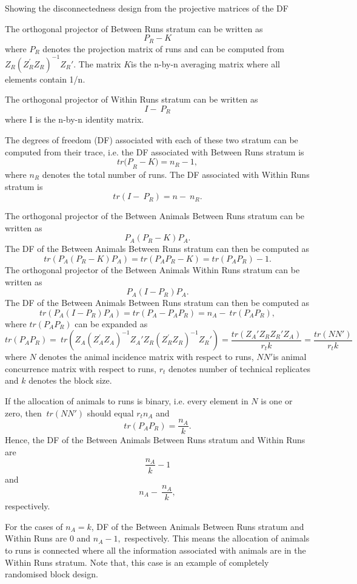 
\noindent Showing the disconnectedness design from the projective matrices of the DF

\noindent The orthogonal projector of Between Runs stratum can be written as 
\[P_R-K\] 
where $P_R$ denotes the projection matrix of runs and can be computed from $Z_R{(Z^'_RZ_R)}^{-1}Z_R'$. The matrix $K$is the n-by-n averaging matrix where all elements contain 1/n. 

\noindent The orthogonal projector of Within Runs stratum can be written as 
\[I-\ P_R\] 
where I is the n-by-n identity matrix. 

\noindent The degrees of freedom (DF) associated with each of these two stratum can be computed from their trace, i.e. the DF associated with Between Runs stratum is 
\[{tr(P}_R-K)=n_R-1,\] 
where $n_R$ denotes the total number of runs. The DF associated with Within Runs stratum is 
\[tr\left(I-\ P_R\right)=n-\ n_R.\] 


\noindent The orthogonal projector of the Between Animals Between Runs stratum can be written as 
\[P_A\left(P_R-K\right)P_A.\] 
The DF of the Between Animals Between Runs stratum can then be computed as
\[tr\left(P_A\left(P_R-K\right)P_A\right)=tr\left(P_AP_R-K\right)=tr\left(P_AP_R\right)-1.\] 
The orthogonal projector of the Between Animals Within Runs stratum can be written as 
\[P_A\left(I-P_R\right)P_A.\] 
The DF of the Between Animals Between Runs stratum can then be computed as
\[tr\left(P_A\left(I-P_R\right)P_A\right)=tr\left(P_A-P_AP_R\right)=n_A-\ tr\left(P_AP_R\right),\] 
where $tr\left(P_AP_R\right)$ can be expanded as 
\[tr\left(P_AP_R\right)=\ tr\left(Z_A{(Z^'_AZ_A)}^{-1}Z_A'Z_R{(Z^'_RZ_R)}^{-1}Z_R'\right)=\frac{tr(Z_A'Z_RZ_R'Z_A)}{r_tk}=\frac{tr(NN')}{r_tk}\ \] 
where $N$ denotes the animal incidence matrix with respect to runs, $NN'$is animal concurrence matrix with respect to runs,  $r_t$ denotes number of technical replicates and $k$ denotes the block size. 

\noindent If the allocation of animals to runs is binary, i.e. every element in $N$ is one or zero, then $\ tr(NN')$ should equal $r_tn_A$ and 
\[tr\left(P_AP_R\right)=\frac{n_A}{k}.\] 
Hence, the DF of the Between Animals Between Runs stratum and Within Runs are
\[\frac{n_A}{k}-1\] 
and  
\[n_A-\ \frac{n_A}{k},\] 
respectively. 

\noindent For the cases of $n_A=k$, DF of the Between Animals Between Runs stratum and Within Runs are 0 and $n_A-1,$ respectively. This means the allocation of animals to runs is connected where all the information associated with animals are in the Within Runs stratum. Note that, this case is an example of completely randomised block design. 

